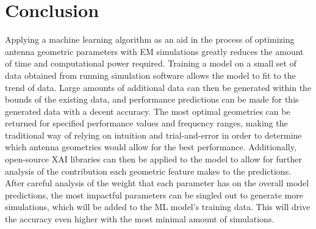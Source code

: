 \documentclass[conference]{IEEEtran}
\begin{document}
\section{Conclusion}
Applying a machine learning algorithm as an aid in the process of optimizing antenna geometric parameters with EM simulations greatly reduces the amount of time and computational power required. Training a model on a small set of data obtained from running simulation software allows the model to fit to the trend of data. Large amounts of additional data can then be generated within the bounds of the existing data, and performance predictions can be made for this generated data with a decent accuracy. The most optimal geometries can be returned for specified performance values and frequency ranges, making the traditional way of relying on intuition and trial-and-error in order to determine which antenna geometries would allow for the best performance. Additionally, open-source XAI libraries can then be applied to the model to allow for further analysis of the contribution each geometric feature makes to the predictions. After careful analysis of the weight that each parameter has on the overall model predictions, the most impactful parameters can be singled out to generate more simulations, which will be added to the ML model's training data. This will drive the accuracy even higher with the most minimal amount of simulations. 



\end{document}
